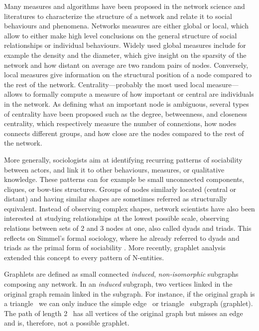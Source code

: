 Many measures and algorithms have been proposed in the network science and \sna literatures to characterize the structure of a network and relate it to social behaviours and phenomena.
Networks measures are either global or local, which allow to either make high level conclusions on the general structure of social relationships or individual behaviours.
Widely used global measures include for example the density and the diameter, which give insight on the sparsity of the network and how distant on average are two random pairs of nodes.
Conversely, local measures give information on the structural position of a node compared to the rest of the network.
Centrality---probably the most used local measure---allows to formally compute a measure of how important or central are individuals in the network.
As defining what an important node is ambiguous, several types of centrality have been proposed such as the degree, betweenness, and closeness centrality, which respectively measure the number of connexions, how nodes connects different groups, and how close are the nodes compared to the rest of the network.

More generally, sociologists aim at identifying recurring patterns of sociability between actors, and link it to other behaviours, measures, or qualitative knowledge.
These patterns can for example be small unconnected components, cliques, or bow-ties structures.
Groups of nodes similarly located (central or distant) and having similar shapes are sometimes referred as structurally equivalent\cite{lemercier12FormalNetwork2015}.
Instead of observing complex shapes, network scientists have also been interested at studying relationships at the lowest possible scale, \ie observing relations between sets of 2 and 3 nodes at one, also called dyads and triads\cite{wassermanSocialNetworkAnalysis1994}.
This reflects on Simmel's formal sociology, where he already referred to dyads and triads as the primal form of sociability \cite{Simmel2013}.
More recently, graphlet analysis extended this concept to every pattern of N-entities\cite{miloNetworkMotifsSimple2002, pržuljBiologicalNetworkComparison2007}.

Graphlets are defined as small connected \emph{induced}, \emph{non-isomorphic} subgraphs composing any network\cite{miloNetworkMotifsSimple2002}.
In an \emph{induced} subgraph, two vertices linked in the original graph remain linked in the subgraph.
For instance, if the original graph is a triangle \TRIANGLE\ we can only induce the simple edge \EDGE\ or triangle \TRIANGLE\ subgraph (graphlet).
The path of length 2 \PATH\ has all vertices of the original graph but misses an edge and is, therefore, not a possible graphlet.


